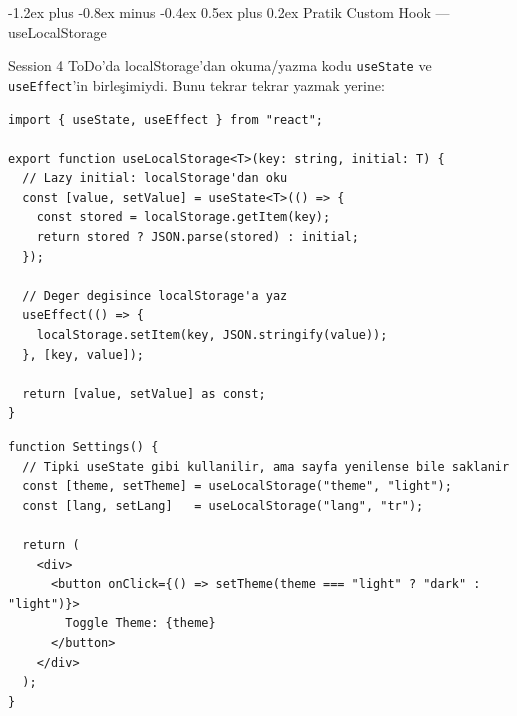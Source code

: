 \documentclass[12pt, a4paper]{article}
\makeatletter
\renewcommand{\subsection}{%
  \@startsection{subsection}{2}{\z@}%
    {-1.2ex plus -0.8ex minus -0.4ex}%
    {0.5ex plus 0.2ex}%
    {\normalfont\large\bfseries\sffamily\color{secondary}}%
}
\makeatother
\begin{document}
\newpage
\subsection{Pratik Custom Hook --- useLocalStorage}

Session 4 ToDo'da localStorage'dan okuma/yazma kodu \texttt{useState} ve
\texttt{useEffect}'in birleşimiydi. Bunu tekrar tekrar yazmak yerine:

\vspace{6pt}

\begin{tcolorbox}[enhanced, colback=codebg, colframe=gray!30,
    colbacktitle=hookcol!85!black, coltitle=white, arc=4pt,
    title={\sffamily\bfseries\small useLocalStorage.ts}]
\begin{lstlisting}[style=jsxstyle]
import { useState, useEffect } from "react";

export function useLocalStorage<T>(key: string, initial: T) {
  // Lazy initial: localStorage'dan oku
  const [value, setValue] = useState<T>(() => {
    const stored = localStorage.getItem(key);
    return stored ? JSON.parse(stored) : initial;
  });

  // Deger degisince localStorage'a yaz
  useEffect(() => {
    localStorage.setItem(key, JSON.stringify(value));
  }, [key, value]);

  return [value, setValue] as const;
}
\end{lstlisting}
\end{tcolorbox}

\vspace{4pt}

\begin{tcolorbox}[enhanced, colback=codebg, colframe=gray!30,
    colbacktitle=primary!85!black, coltitle=white, arc=4pt,
    title={\sffamily\bfseries\small Kullanım --- useState Gibi}]
\begin{lstlisting}[style=jsxstyle]
function Settings() {
  // Tipki useState gibi kullanilir, ama sayfa yenilense bile saklanir
  const [theme, setTheme] = useLocalStorage("theme", "light");
  const [lang, setLang]   = useLocalStorage("lang", "tr");

  return (
    <div>
      <button onClick={() => setTheme(theme === "light" ? "dark" : "light")}>
        Toggle Theme: {theme}
      </button>
    </div>
  );
}
\end{lstlisting}
\end{tcolorbox}
\end{document}
